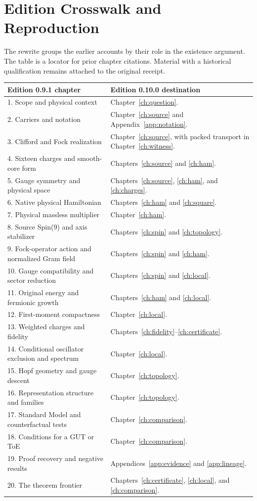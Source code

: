 \chapter{Edition Crosswalk and Reproduction}\label{app:crosswalk}
The rewrite groups the earlier accounts by their role in the existence argument. The table is a locator for prior chapter citations. Material with a historical qualification remains attached to the original receipt.

\small
\begin{longtable}{@{}p{}p{}@{}}
\toprule Edition 0.9.1 chapter & Edition 0.10.0 destination\\
\midrule
\endhead
1. Scope and physical context & Chapter~\ref{ch:question}.\\
2. Carriers and notation & Chapter~\ref{ch:source} and Appendix~\ref{app:notation}.\\
3. Clifford and Fock realization & Chapter~\ref{ch:source}, with packed transport in Chapter~\ref{ch:witness}.\\
4. Sixteen charges and smooth-core form & Chapters~\ref{ch:source} and \ref{ch:ham}.\\
5. Gauge symmetry and physical space & Chapters~\ref{ch:source}, \ref{ch:ham}, and \ref{ch:charges}.\\
6. Native physical Hamiltonian & Chapters~\ref{ch:ham} and \ref{ch:square}.\\
7. Physical massless multiplier & Chapter~\ref{ch:ham}.\\
8. Source Spin(9) and axis stabilizer & Chapters~\ref{ch:spin} and \ref{ch:topology}.\\
9. Fock-operator action and normalized Gram field & Chapters~\ref{ch:spin} and \ref{ch:ham}.\\
10. Gauge compatibility and sector reduction & Chapters~\ref{ch:spin} and \ref{ch:local}.\\
11. Original energy and fermionic growth & Chapters~\ref{ch:ham} and \ref{ch:local}.\\
12. First-moment compactness & Chapter~\ref{ch:local}.\\
13. Weighted charges and fidelity & Chapters~\ref{ch:fidelity}--\ref{ch:certificate}.\\
14. Conditional oscillator exclusion and spectrum & Chapter~\ref{ch:local}.\\
15. Hopf geometry and gauge descent & Chapter~\ref{ch:topology}.\\
16. Representation structure and families & Chapter~\ref{ch:topology}.\\
17. Standard Model and counterfactual tests & Chapter~\ref{ch:comparison}.\\
18. Conditions for a GUT or ToE & Chapter~\ref{ch:comparison}.\\
19. Proof recovery and negative results & Appendices~\ref{app:evidence} and \ref{app:lineage}.\\
20. The theorem frontier & Chapters~\ref{ch:certificate}, \ref{ch:local}, and \ref{ch:comparison}.\\
\bottomrule
\end{longtable}
\normalsize

